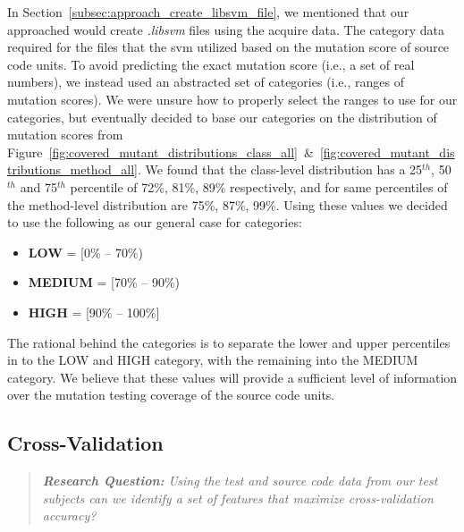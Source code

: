 In Section~\ref{subsec:approach_create_libsvm_file}, we mentioned that our approached would create \emph{.libsvm} files using the acquire data. The category data required for the files that the \gls{svm} utilized based on the mutation score of source code units. To avoid predicting the exact mutation score (i.e., a set of real numbers), we instead used an abstracted set of categories (i.e., ranges of mutation scores). We were unsure how to properly select the ranges to use for our categories, but eventually decided to base our categories on the distribution of mutation scores from Figure~\ref{fig:covered_mutant_distributions_class_all}~\&~\ref{fig:covered_mutant_distributions_method_all}. We found that the class-level distribution has a 25$^{th}$, 50$^{th}$ and 75$^{th}$ percentile of 72\%, 81\%, 89\% respectively, and for same percentiles of the method-level distribution are 75\%, 87\%, 99\%. Using these values we decided to use the following as our general case for categories:

\begin{itemize}
  \item \textbf{LOW} = [0\% -- 70\%)
  \item \textbf{MEDIUM} = [70\% -- 90\%)
  \item \textbf{HIGH} = [90\% -- 100\%]
\end{itemize}

The rational behind the categories is to separate the lower and upper percentiles in to the LOW and HIGH category, with the remaining into the MEDIUM category. We believe that these values will provide a sufficient level of information over the mutation testing coverage of the source code units.


\subsection{Cross-Validation}
\label{subsec:experiment_cross_validation}
\begin{quote}
	\emph{\textbf{Research Question:} Using the test and source code data from our test subjects can we identify a set of features that maximize cross-validation accuracy?}
\end{quote}

